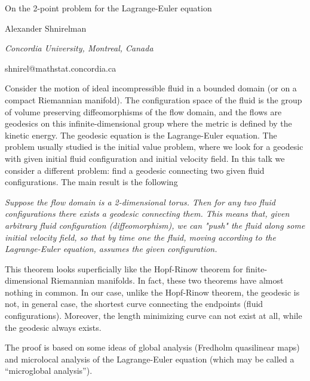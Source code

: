 \documentclass[10pt,a4paper]{article}
\begin{document}
\begin{center}

{\Large On the 2-point problem for the Lagrange-Euler equation}

\bigskip

{\sc Alexander Shnirelman}

{\small\it Concordia University, Montreal, Canada}

{\small\rm shnirel@mathstat.concordia.ca}

\end{center}

\bigskip

Consider the motion of ideal incompressible fluid in a bounded
domain (or on a compact Riemannian manifold). The configuration space of
the fluid is the group of volume preserving diffeomorphisms of the flow
domain, and the flows are geodesics on this infinite-dimensional group
where the metric is defined by the kinetic energy. The geodesic equation is
the Lagrange-Euler equation. The problem usually studied is the initial
value problem, where we look for a geodesic with given initial fluid
configuration and initial velocity field. In this talk we consider a
different problem: find a geodesic connecting two given fluid
configurations. The main result is the following

\smallskip

{\it Suppose the flow domain is a 2-dimensional torus. Then for any two
fluid configurations there exists a geodesic connecting them. This means
that, given arbitrary fluid configuration (diffeomorphism), we can "push"
the fluid along some initial velocity field, so that by time one the fluid,
moving according to the Lagrange-Euler equation, assumes the given
configuration.}

\smallskip

This theorem looks superficially like the Hopf-Rinow theorem for
finite-dimensional Riemannian manifolds. In fact, these two theorems have
almost nothing in common. In our case, unlike the Hopf-Rinow theorem, the
geodesic is not, in general case, the shortest curve connecting the
endpoints (fluid configurations). Moreover, the length minimizing curve can
not exist at all, while the geodesic always exists.

The proof is based on some ideas of global analysis (Fredholm quasilinear
maps) and microlocal analysis of the Lagrange-Euler equation (which may be
called a ``microglobal analysis'').
\end{document}
